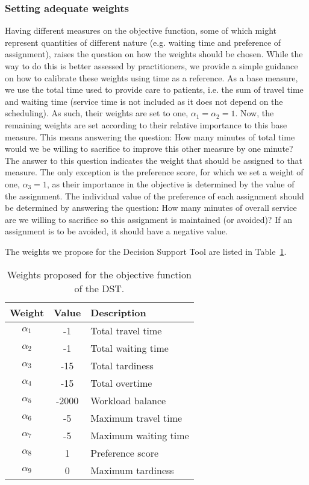 \documentclass[a4paper,11pt,authoryear]{elsarticle}
\begin{document}
\subsubsection{Setting adequate weights}
\label{subsub:adequateweights}
\noindent Having different measures on the objective function, some of which might represent quantities of different nature (e.g. waiting time and preference of assignment), raises the question on how the weights should be chosen. While the way to do this is better assessed by practitioners, we provide a simple guidance on how to calibrate these weights using time as a reference.
As a base measure, we use the total time used to provide care to patients, i.e. the sum of travel time and waiting time (service time is not included as it does not depend on the scheduling). As such, their weights are set to one, $\alpha_1 = \alpha_2 = 1$.
Now, the remaining weights are set according to their relative importance to this base measure. This means answering the question: How many minutes of total time would we be willing to sacrifice to improve this other measure by one minute? The answer to this question indicates the weight that should be assigned to that measure.
The only exception is the preference score, for which we set a weight of one, $\alpha_3 = 1$, as their importance in the objective is determined by the value of the assignment. The individual value of the preference of each assignment should be determined by answering the question: How many minutes of overall service are we willing to sacrifice so this assignment is maintained (or avoided)? If an assignment is to be avoided, it should have a negative value.

The weights we propose for the Decision Support Tool are listed in Table~\ref{table:adequateweights}.

\begin{table}[htbp!]
    \centering
    \caption{Weights proposed for the objective function of the DST.}
    \begin{tabular}{ccl}
    \toprule
    \textbf{Weight}  & \textbf{Value} & \textbf{Description} \\
    \midrule
    $\alpha_1$      &   -1   &   Total travel time \\
    $\alpha_2$      &   -1   &   Total waiting time \\
    $\alpha_3$      &   -15   &   Total tardiness \\
    $\alpha_4$      &   -15   &   Total overtime \\   
    $\alpha_5$      &   -2000   &   Workload balance\\       
    $\alpha_6$      &   -5   &   Maximum travel time\\       
    $\alpha_7$      &   -5   &   Maximum waiting time\\       
    $\alpha_8$      &   1   &   Preference score \\    
    $\alpha_9$      &   0   &   Maximum tardiness\\    
    \bottomrule
    \end{tabular}
    \label{table:adequateweights}
\end{table}
\end{document}
